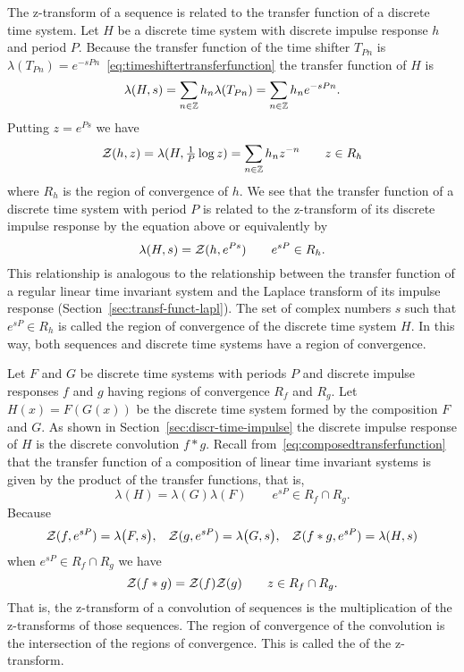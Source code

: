 The z-transform of a sequence is related to the transfer function of a discrete time system.  Let $H$ be a discrete time system with discrete impulse response $h$ and period $P$.  Because the transfer function of the time shifter $T_{Pn}$ is $\lambda(T_{Pn}) = e^{-sPn}$~\eqref{eq:timeshiftertransferfunction} the transfer function of $H$ is
\[
\lambda(H,s) = \sum_{n \in {\mathbb Z}} h_n \lambda( T_{Pn} ) = \sum_{n \in {\mathbb Z}} h_n e^{-sP n}.
\]
Putting $z = e^{Ps}$ we have
\[
{\mathcal Z}(h,z) = \lambda(H, \tfrac{1}{P} \log z) = \sum_{n \in {\mathbb Z}} h_n z^{-n} \qquad z \in R_h
\]
where $R_h$ is the region of convergence of $h$.  We see that the transfer function of a discrete time system with period $P$ is related to the z-transform of its discrete impulse response by the equation above or equivalently by
\begin{equation}\label{eq:reltransferfunztrans}
\lambda(H,s) = {\mathcal Z}(h,e^{Ps}) \qquad e^{sP} \in R_h.
\end{equation}
This relationship is analogous to the relationship between the transfer function of a regular linear time invariant system and the Laplace transform of its impulse response (Section~\ref{sec:transf-funct-lapl}).  The set of complex numbers $s$ such that $e^{sP} \in R_h$ is called the region of convergence of the discrete time system $H$.  In this way, both sequences and discrete time systems have a region of convergence. 

Let $F$ and $G$ be discrete time systems with periods $P$ and discrete impulse responses $f$ and $g$ having regions of convergence $R_f$ and $R_g$.  Let $H(x) = F(G(x))$ be the discrete time system formed by the composition $F$ and $G$.  As shown in Section~\ref{sec:discr-time-impulse} the discrete impulse response of $H$ is the discrete convolution $f * g$.  Recall from~\eqref{eq:composedtransferfunction} that the transfer function of a composition of linear time invariant systems is given by the product of the transfer functions, that is,
\[
\lambda( H ) = \lambda(G)\lambda(F) \qquad e^{sP} \in R_f \cap R_g.
\]
Because
\[
{\mathcal Z}(f, e^{sP}) = \lambda\big( F ,s \big) , \;\;\; {\mathcal Z}(g, e^{sP}) = \lambda\big( G ,s \big), \;\;\; {\mathcal Z}(f * g, e^{sP}) = \lambda( H ,s )
\]
when $e^{sP} \in R_f \cap R_g$ we have
\[
{\mathcal Z}( f * g) = {\mathcal Z}(f) {\mathcal Z}(g) \qquad z \in R_f \cap R_g.
\]
That is, the z-transform of a convolution of sequences is the multiplication of the z-transforms of those sequences.  The region of convergence of the convolution is the intersection of the regions of convergence.  This is called the  of the z-transform.

